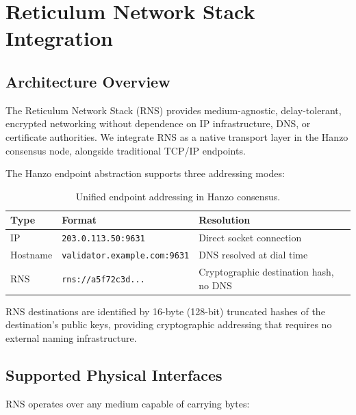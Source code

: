 \documentclass[11pt,letterpaper]{article}
\begin{document}
\section{Reticulum Network Stack Integration}

\subsection{Architecture Overview}

The Reticulum Network Stack (RNS) provides medium-agnostic, delay-tolerant, encrypted networking without dependence on IP infrastructure, DNS, or certificate authorities. We integrate RNS as a native transport layer in the Hanzo consensus node, alongside traditional TCP/IP endpoints.

The Hanzo endpoint abstraction supports three addressing modes:

\begin{table}[H]
\centering
\begin{tabular}{@{}llp{5.5cm}@{}}
\toprule
\textbf{Type} & \textbf{Format} & \textbf{Resolution} \\
\midrule
IP & \texttt{203.0.113.50:9631} & Direct socket connection \\
Hostname & \texttt{validator.example.com:9631} & DNS resolved at dial time \\
RNS & \texttt{rns://a5f72c3d...} & Cryptographic destination hash, no DNS \\
\bottomrule
\end{tabular}
\caption{Unified endpoint addressing in Hanzo consensus.}
\label{tab:endpoints}
\end{table}

RNS destinations are identified by 16-byte (128-bit) truncated hashes of the destination's public keys, providing cryptographic addressing that requires no external naming infrastructure.

\subsection{Supported Physical Interfaces}

RNS operates over any medium capable of carrying bytes:
\end{document}
